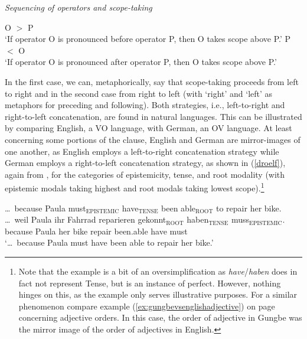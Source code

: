 \newpage 
\begin{exe} 
\ex \textit{Sequencing of operators and scope-taking} \label{beispielvierzehn} 
\begin{xlist} 
\ex 		O $>$ P \\ `If operator O is pronounced before operator P, then O takes scope above P.' \label{beispielvierzehna}
\ex P $<$ O \\ `If operator O is pronounced after operator P, then O takes scope above P.' \label{beispielvierzehnb} 
\end{xlist} 
\end{exe}

\noindent In the first case, we can, metaphorically, say that scope-taking proceeds from left to right and in the second case from right to left (with `right' and `left' as metaphors for preceding and following). Both strategies, i.e., left-to-right and right-to-left concatenation, are found in natural languages. This can be illustrated by comparing English, a VO language, with German, an OV language. At least concerning some portions of the clause, English and German are mirror-images of one another, as English employs a  left-to-right concatenation strategy while German employs a right-to-left concatenation strategy, as shown in (\ref{droelf}), again from \citet[11]{bross2017scope}, for the categories of epistemicity, tense, and root modality (with epistemic modals taking highest and root modals taking lowest scope).\footnote{ Note that the example is a bit of an oversimplification as \textit{have}/\textit{haben} does in fact not represent Tense, but is an instance of perfect. However, nothing hinges on this, as the example only serves illustrative purposes. For a similar phenomenon compare example (\ref{ex:gungbevsenglishadjective}) on page \pageref{ex:gungbevsenglishadjective} concerning adjective orders. In this case, the order of adjective in Gungbe was the mirror image of the order of adjectives in English.}

\begin{exe} 
\ex \label{droelf}
\begin{xlist} 
\ex 	\dots\ because Paula must$_{\text{EPISTEMIC}}$ have$_{\text{TENSE}}$ been able$_{\text{ROOT}}$ to repair her bike.\label{beispieldreizehna}
\ex \gll \dots\ weil Paula ihr Fahrrad reparieren gekonnt$_{\text{ROOT}}$	haben$_{\text{TENSE}}$ muss$_{\text{EPISTEMIC}}$. \\
because Paula	her	bike		repair			been.able	  	have			must \\
\glt `\dots\ because Paula must have been able to repair her bike.'
 \label{beispieldreizehnb} 

\end{xlist} 
\end{exe}

